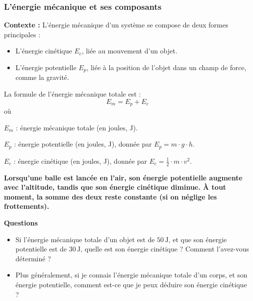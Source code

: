 \documentclass[a4paper,12pt]{article}
\begin{document}
  \subsubsection*{L'énergie mécanique et ses composants}

  \textbf{Contexte :} L'énergie mécanique d'un système se compose de deux formes principales :
  \begin{itemize}
      \item L'énergie cinétique $E_c$, liée au mouvement d'un objet.
      \item L'énergie potentielle $E_p$, liée à la position de l'objet dans un champ de force, comme la gravité.
  \end{itemize}
  
  La formule de l'énergie mécanique totale est :
  \[
  E_m = E_p + E_c
  \]
  où

  \begin{addmargin}[4em]{1em}
  \begin{compactitem}
      \item [$E_m$] : énergie mécanique totale (en joules, J).
      \item [$E_p$] : énergie potentielle (en joules, J), donnée par $E_p = m \cdot g \cdot h$.
      \item [$E_c$] : énergie cinétique (en joules, J), donnée par $E_c = \frac{1}{2} \cdot m \cdot v^2$.
  \end{compactitem}
  \end{addmargin}

\vspace{1em}
  \textbf{Lorsqu'une balle est lancée en l'air, son énergie potentielle augmente avec l'altitude, tandis que son énergie cinétique diminue. À tout moment, la somme des deux reste constante (si on néglige les frottements).}
  
\vspace{1em}
\textbf{Questions}

  \begin{itemize}
    \item Si l'énergie mécanique totale d'un objet est de $50 \, \mathrm{J}$, et que son énergie potentielle est de $30 \, \mathrm{J}$, quelle est son énergie cinétique ? Comment l'avez-vous déterminé ?
    \item Plus généralement, si je connais l'énergie mécanique totale d'un corps, et son énergie potentielle, comment est-ce que je peux déduire son énergie cinétique ?
\end{itemize}
\end{document}
